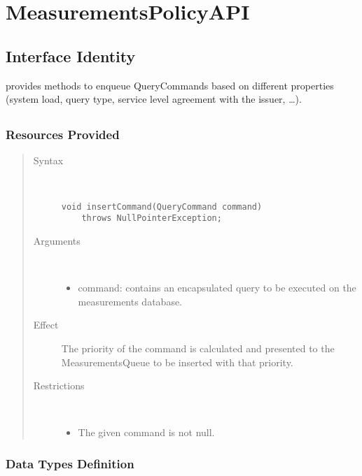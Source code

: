 \section{MeasurementsPolicyAPI}
\label{api:measurements-policy-api}

\subsection{Interface Identity}

\npar {} provides methods to enqueue
QueryCommands based on different properties (system load, query type, service
level agreement with the issuer, \ldots).

\subsection{}

\subsubsection{Resources Provided}

\begin{quote}
	\begin{description}
		\item[Syntax] \ 
		\begin{verbatim}
void insertCommand(QueryCommand command) 
    throws NullPointerException;
		\end{verbatim}
		\item[Arguments] \
		\begin{itemize}
			\item command: contains an encapsulated query to be executed on the
			measurements database.
		\end{itemize}
		\item[Effect] The priority of the command is calculated and presented to the
		MeasurementsQueue to be inserted with that priority.
		\item[Restrictions] \ 
		\begin{itemize}
			\item The given command is not null.
		\end{itemize}
	\end{description} 
\end{quote}

\subsubsection{Data Types Definition}

